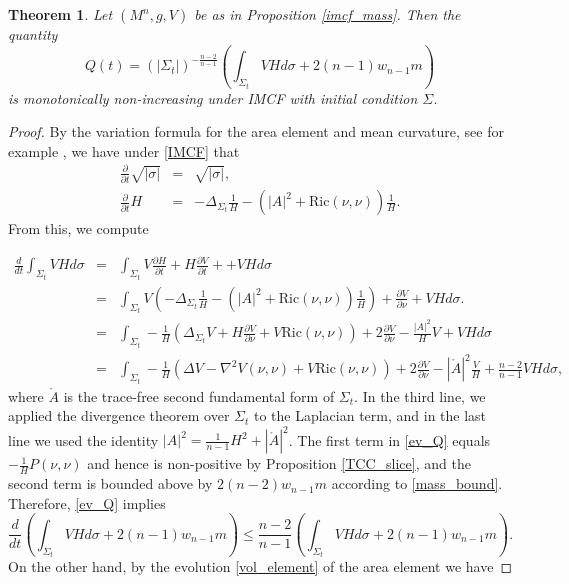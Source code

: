 \documentclass[12pt]{amsart}
\newtheorem{theorem}{Theorem}[section]
\theoremstyle{definition}
\numberwithin{equation}{section}
\begin{document}
\begin{theorem}
Let $(M^{n},g,V)$ be as in Proposition \ref{imcf_mass}. Then the quantity
\begin{equation} \label{Q}
    Q(t) = \left( |\Sigma_{t}| \right)^{-\frac{n-2}{n-1}} \left( \int_{\Sigma_{t}} VH d\sigma + 2(n-1) w_{n-1} m \right)
\end{equation}
is monotonically non-increasing under IMCF with initial condition $\Sigma$. 
\end{theorem}
\begin{proof}
By the variation formula for the area element and mean curvature, see for example \cite{HP99}, we have under \eqref{IMCF} that
\begin{eqnarray}
    \frac{\partial}{\partial t} \sqrt{|\sigma|} &=& \sqrt{|\sigma|}, \label{vol_element} \\
    \frac{\partial}{\partial t} H &=& -\Delta_{\Sigma_{t}} \frac{1}{H} - (|A|^{2} + \text{Ric}(\nu,\nu)) \frac{1}{H}.
\end{eqnarray}
From this, we compute

\begin{eqnarray}
    \frac{d}{dt}  \int_{\Sigma_{t}} VH d\sigma &=& \int_{\Sigma_{t}} V \frac{\partial H}{\partial t} +  H \frac{\partial V}{\partial t} + + VH d\sigma \nonumber \\
    &=& \int_{\Sigma_{t}}  V \left( -\Delta_{\Sigma_{t}} \frac{1}{H} - (|A|^{2} + \text{Ric}(\nu,\nu)) \frac{1}{H} \right) + \frac{\partial V}{\partial \nu} + VH d\sigma. \nonumber \\
    &=& \int_{\Sigma_{t}} - \frac{1}{H} \left( \Delta_{\Sigma_{t}} V + H \frac{\partial V}{\partial \nu} + V \text{Ric}(\nu,\nu) \right) + 2 \frac{\partial V}{\partial \nu} - \frac{|A|^{2}}{H} V + VH d\sigma \nonumber \\
    &=& \int_{\Sigma_{t}} - \frac{1}{H} \left( \Delta V - \nabla^{2} V(\nu,\nu) + V\text{Ric}(\nu,\nu)\right) + 2 \frac{\partial V}{\partial \nu} - |\mathring{A}|^{2} \frac{V}{H} + \frac{n-2}{n-1} VH d\sigma, \label{ev_Q}
\end{eqnarray}
where $\mathring{A}$ is the trace-free second fundamental form of $\Sigma_{t}$. In the third line, we applied the divergence theorem over $\Sigma_{t}$ to the Laplacian term, and in the last line we used the identity $|A|^{2}= \frac{1}{n-1}H^{2} + |\mathring{A}|^{2}$. The first term in \eqref{ev_Q} equals $-\frac{1}{H} P(\nu, \nu)$ and hence is non-positive by Proposition \ref{TCC_slice}, and the second term is bounded above by $2(n-2)w_{n-1} m$ according to \eqref{mass_bound}. Therefore, \eqref{ev_Q} implies
\begin{equation*}
    \frac{d}{dt}  \left( \int_{\Sigma_{t}} VH d\sigma + 2(n-1) w_{n-1} m \right) \leq \frac{n-2}{n-1} \left( \int_{\Sigma_{t}} VH d\sigma + 2(n-1) w_{n-1} m \right).
\end{equation*}
On the other hand, by the evolution \eqref{vol_element} of the area element we have


\end{proof}
\end{document}
